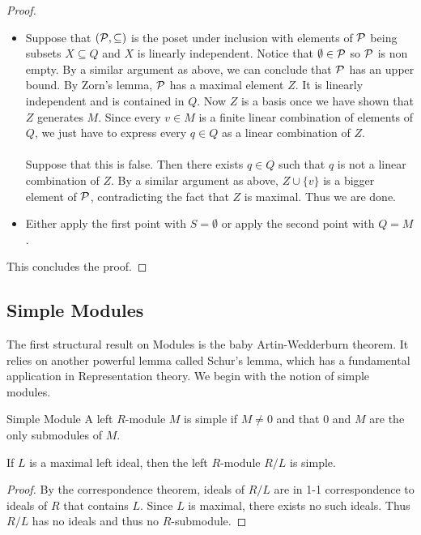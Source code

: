 \documentclass[a4paper]{article}
\begin{document}
\begin{thm}{}{}
\begin{proof}
\begin{itemize}
\item Suppose that $(\mathcal{P},\subseteq)$ is the poset under inclusion with elements of $\mathcal{P}$ being subsets $X\subseteq Q$ and $X$ is linearly independent. Notice that $\emptyset\in\mathcal{P}$ so $\mathcal{P}$ is non empty. By a similar argument as above, we can conclude that $\mathcal{P}$ has an upper bound. By Zorn's lemma, $\mathcal{P}$ has a maximal element $Z$. It is linearly independent and is contained in $Q$. Now $Z$ is a basis once we have shown that $Z$ generates $M$. Since every $v\in M$ is a finite linear combination of elements of $Q$, we just have to express every $q\in Q$ as a linear combination of $Z$. \\~\\

Suppose that this is false. Then there exists $q\in Q$ such that $q$ is not a linear combination of $Z$. By a similar argument as above, $Z\cup\{v\}$ is a bigger element of $\mathcal{P}$, contradicting the fact that $Z$ is maximal. Thus we are done. 

\item Either apply the first point with $S=\emptyset$ or apply the second point with $Q=M$. 
\end{itemize}
This concludes the proof. 
\end{proof}
\end{thm}

\subsection{Simple Modules}
The first structural result on Modules is the baby Artin-Wedderburn theorem. It relies on another powerful lemma called Schur's lemma, which has a fundamental application in Representation theory. We begin with the notion of simple modules. 

\begin{defn}{Simple Module}{} A left $R$-module $M$ is simple if $M\neq 0$ and that $0$ and $M$ are the only submodules of $M$. 
\end{defn}

\begin{lmm}{}{} If $L$ is a maximal left ideal, then the left $R$-module $R/L$ is simple. \tcbline
\begin{proof}
By the correspondence theorem, ideals of $R/L$ are in 1-1 correspondence to ideals of $R$ that contains $L$. Since $L$ is maximal, there exists no such ideals. Thus $R/L$ has no ideals and thus no $R$-submodule. 
\end{proof}
\end{lmm}
\end{document}
